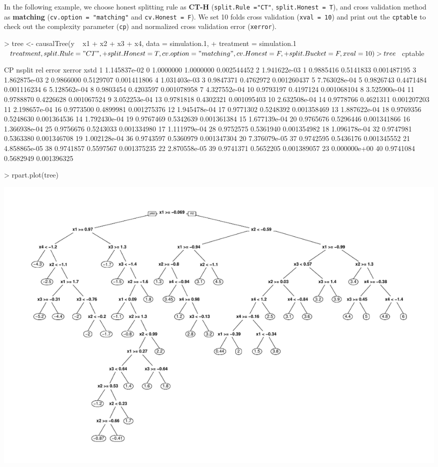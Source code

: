 \documentclass[11pt]{article}
\renewenvironment{Schunk}{\vspace{\topsep}}{\vspace{\topsep}}
\begin{document}
In the following example, we choose honest splitting rule as \textbf{CT-H} (\texttt{split.Rule ="CT"}, \texttt{split.Honest = T}), and cross validation method as \textbf{matching} (\texttt{cv.option = "matching"} and \texttt{cv.Honest = F}). We set 10 folds cross validation (\texttt{xval = 10}) and print out the \texttt{cptable} to check out the complexity parameter (\texttt{cp}) and normalized cross validation error (\texttt{xerror}).
\begin{Schunk}
\begin{Sinput}
> tree <- causalTree(y ~ x1 + x2 + x3 + x4, data = simulation.1,
+                   treatment = simulation.1$treatment, split.Rule = "CT",
+                   split.Honest = T, cv.option = "matching", cv.Honest = F,
+                   split.Bucket = F, xval = 10)
> tree$cptable
\end{Sinput}
\begin{Soutput}
             CP nsplit rel error    xerror        xstd
1  1.145837e-02      0 1.0000000 1.0000000 0.002544452
2  1.941622e-03      1 0.9885416 0.5141833 0.001487195
3  1.862875e-03      2 0.9866000 0.5129707 0.001411806
4  1.031403e-03      3 0.9847371 0.4762972 0.001260437
5  7.763028e-04      5 0.9826743 0.4471484 0.001116234
6  5.128562e-04      8 0.9803454 0.4203597 0.001078958
7  4.327552e-04     10 0.9793197 0.4197124 0.001068104
8  3.525900e-04     11 0.9788870 0.4226628 0.001067524
9  3.052253e-04     13 0.9781818 0.4302321 0.001095403
10 2.632508e-04     14 0.9778766 0.4621311 0.001207203
11 2.198657e-04     16 0.9773500 0.4899981 0.001275376
12 1.945478e-04     17 0.9771302 0.5248392 0.001358469
13 1.887622e-04     18 0.9769356 0.5248630 0.001364536
14 1.792430e-04     19 0.9767469 0.5342639 0.001361384
15 1.677139e-04     20 0.9765676 0.5296446 0.001341866
16 1.366938e-04     25 0.9756676 0.5243033 0.001334980
17 1.111979e-04     28 0.9752575 0.5361940 0.001354982
18 1.096178e-04     32 0.9747981 0.5363380 0.001346708
19 1.002128e-04     36 0.9743597 0.5360979 0.001347304
20 7.376079e-05     37 0.9742595 0.5436176 0.001345552
21 4.858865e-05     38 0.9741857 0.5597567 0.001375235
22 2.870558e-05     39 0.9741371 0.5652205 0.001389057
23 0.000000e+00     40 0.9741084 0.5682949 0.001396325
\end{Soutput}
\begin{Sinput}
> rpart.plot(tree)
\end{Sinput}
\end{Schunk}
\includegraphics{briefintro-example2}
\end{document}
